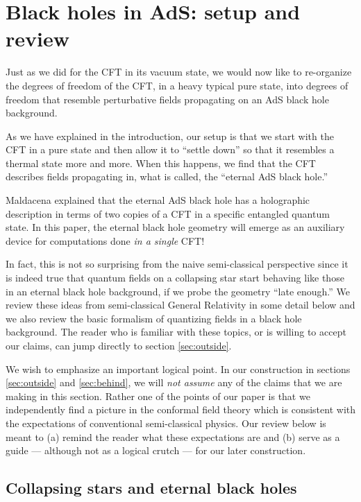 \section{Black holes in AdS: setup and review}
\label{semiblack}

Just as we did for the 
CFT in its vacuum state, we would now like to re-organize the degrees of
freedom of the CFT, in a heavy typical pure state, into degrees of freedom
that resemble perturbative fields propagating on an AdS black hole
background. 

As we have explained in the introduction, our setup is that we start with
the CFT in a pure state and then allow it to ``settle down'' so that
it resembles a thermal state more and more. When this happens, we 
find that the CFT describes fields propagating in, what is called, the
``eternal AdS black hole.'' 

 Maldacena \cite{Maldacena:2001kr} explained that the eternal AdS black hole has a holographic description in terms of two copies of a CFT in a specific entangled quantum state. In this paper, the eternal black hole geometry will emerge as an auxiliary device for computations done {\it in a single} CFT!

In fact, this is not so surprising from the naive semi-classical perspective since it is indeed true that quantum fields
on a collapsing star start behaving like those in an eternal black hole background, if we probe the
 geometry ``late enough.''  We review these ideas from semi-classical General Relativity in some detail below and we also review the basic formalism of quantizing fields in a black hole background.  The reader who is familiar with
these topics, or is willing to accept our claims, can jump directly to section \ref{sec:outside}.

We wish to emphasize an important logical point. In our construction in sections \ref{sec:outside} and \ref{sec:behind}, we will {\em not assume} any of the claims that we are making in this section. Rather one of the points of our paper is that we independently find a picture in the conformal field theory which is consistent with the
expectations of conventional semi-classical physics. Our review below is meant to (a) remind the reader what these expectations are and (b) serve as a guide --- although not as a logical crutch --- for our later construction. 





\subsection{Collapsing stars and eternal black holes}

